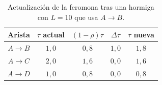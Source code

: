 \begin{table}[H]
\centering
\small
\setlength{\tabcolsep}{6pt}
\renewcommand{\arraystretch}{1.15}
\begin{tabular}{|c|c|c|c|c|}
\hline
\rowcolor{encabezado}\textbf{Arista} & \textbf{$\tau$ actual} & \textbf{$(1-\rho)\tau$} & \textbf{$\Delta\tau$} & \textbf{$\tau$ nueva} \\
\hline
$A\to B$ & $1{,}0$ & $0{,}8$ & $1{,}0$ & $1{,}8$ \\
\hline
$A\to C$ & $2{,}0$ & $1{,}6$ & $0{,}0$ & $1{,}6$ \\
\hline
$A\to D$ & $1{,}0$ & $0{,}8$ & $0{,}0$ & $0{,}8$ \\
\hline
\end{tabular}
\caption{Actualización de la feromona tras una hormiga con $L=10$ que usa $A\to B$.}
\label{tab:p4a-feromonas}
\end{table}
